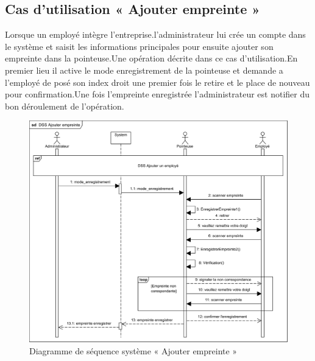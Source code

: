     \subsection*{Cas d'utilisation « Ajouter empreinte »}
    Lorsque un employé intègre l'entreprise.l'administrateur lui crée un compte dans le système et saisit les informations principales pour ensuite ajouter son empreinte dans la pointeuse.Une opération décrite dans ce cas d'utilisation.En premier lieu il active le mode enregistrement de la pointeuse et demande a l'employé de posé son index droit une premier fois le retire et le place de nouveau pour confirmation.Une fois l'empreinte enregistrée l'administrateur est notifier du bon déroulement de l'opération.    
    \clearpage
        \begin{figure}[h!]
             \centering
            \includegraphics[scale=0.85,angle=90]{images/DSS/DSS Ajouter empreinte.png}
             \caption{Diagramme de séquence système « Ajouter empreinte »}
             \label{fig4}
        \end{figure}
        

